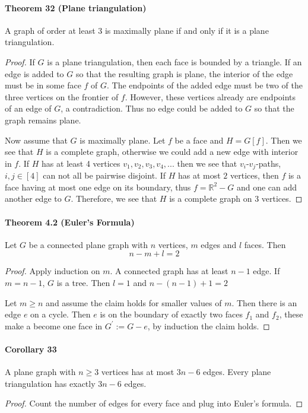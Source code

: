 \paragraph{Theorem 32 (Plane triangulation)} A graph of order at least 3 is 
maximally plane if and only if it is a plane triangulation.
\begin{proof}
    If $G$ is a plane triangulation, then each face is bounded by a triangle. 
    If an edge is added to $G$ so that the resulting graph is plane, the interior
    of the edge must be in some face $f$ of $G$. The endpoints of the added edge
    must be two of the three vertices on the frontier of $f$. However, these
    vertices already are endpoints of an edge of $G$, a contradiction. Thus 
    no edge could be added to $G$ so that the graph remains plane.

    \bigskip
    Now assume that $G$ is maximally plane.
    Let $f$ be a face and $H = G[f]$. Then we see that $H$ is a complete graph,
    otherwise we could add a new edge with interior in $f$. If $H$ has at 
    least 4 vertices $v_1,v_2,v_3,v_4,...$ then we see that $v_i$-$v_j$-paths,
    $i,j \in [4]$ can not all be pairwise disjoint. If $H$ has at most $2$ 
    vertices, then $f$ is a face having at most one edge on its boundary,
    thus $f = \mathbb{R}^2 - G$ and one can add another edge to $G$.
    Therefore, we see that $H$ is a complete graph on 3 vertices.
\end{proof}

\paragraph{Theorem 4.2 (Euler's Formula)} Let $ G $ be a connected plane graph 
with $ n $ vertices, $ m $ edges and $ l $ faces. Then 
$$ n - m + l = 2 $$
\begin{proof}
    Apply induction on $m$. A connected graph has at least $n-1$ edge.
    If $m = n-1$, $G$ is a tree. Then $l=1$ and $n - (n-1) + 1 = 2$
    
    \smallskip \noindent
    Let $m \geq n$ and assume the claim holds for smaller values of $m$.
    Then there is an edge $e$ on a cycle. Then $e$ is on the boundary
    of exactly two faces $f_1$ and $f_2$, these make a become one face 
    in $G^\prime := G - e$, by induction the claim holds.
\end{proof}

\paragraph{Corollary 33} A plane graph with $ n \geq 3 $ vertices has at most 
$ 3n - 6 $ edges. Every plane triangulation has exactly $ 3n - 6 $ edges.
\begin{proof}
    Count the number of edges for every face and plug into Euler's formula.
\end{proof}

